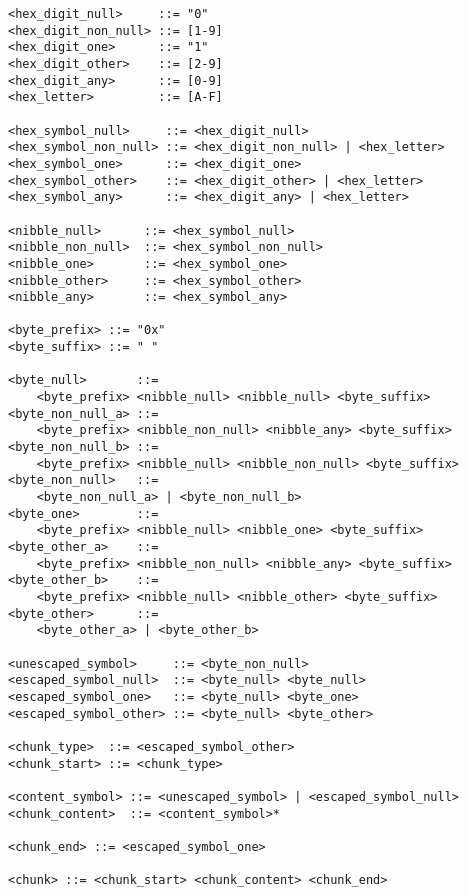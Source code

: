 \begin{lstlisting}
<hex_digit_null>     ::= "0"
<hex_digit_non_null> ::= [1-9]
<hex_digit_one>      ::= "1"
<hex_digit_other>    ::= [2-9]
<hex_digit_any>      ::= [0-9]
<hex_letter>         ::= [A-F]

<hex_symbol_null>     ::= <hex_digit_null>
<hex_symbol_non_null> ::= <hex_digit_non_null> | <hex_letter>
<hex_symbol_one>      ::= <hex_digit_one>
<hex_symbol_other>    ::= <hex_digit_other> | <hex_letter>
<hex_symbol_any>      ::= <hex_digit_any> | <hex_letter>

<nibble_null>      ::= <hex_symbol_null>
<nibble_non_null>  ::= <hex_symbol_non_null>
<nibble_one>       ::= <hex_symbol_one>
<nibble_other>     ::= <hex_symbol_other>
<nibble_any>       ::= <hex_symbol_any>

<byte_prefix> ::= "0x"
<byte_suffix> ::= " "

<byte_null>       ::= 
    <byte_prefix> <nibble_null> <nibble_null> <byte_suffix>
<byte_non_null_a> ::= 
    <byte_prefix> <nibble_non_null> <nibble_any> <byte_suffix>
<byte_non_null_b> ::= 
    <byte_prefix> <nibble_null> <nibble_non_null> <byte_suffix>
<byte_non_null>   ::= 
    <byte_non_null_a> | <byte_non_null_b>
<byte_one>        ::= 
    <byte_prefix> <nibble_null> <nibble_one> <byte_suffix>
<byte_other_a>    ::= 
    <byte_prefix> <nibble_non_null> <nibble_any> <byte_suffix>
<byte_other_b>    ::= 
    <byte_prefix> <nibble_null> <nibble_other> <byte_suffix>
<byte_other>      ::= 
    <byte_other_a> | <byte_other_b>

<unescaped_symbol>     ::= <byte_non_null>
<escaped_symbol_null>  ::= <byte_null> <byte_null>
<escaped_symbol_one>   ::= <byte_null> <byte_one>
<escaped_symbol_other> ::= <byte_null> <byte_other>

<chunk_type>  ::= <escaped_symbol_other>
<chunk_start> ::= <chunk_type>

<content_symbol> ::= <unescaped_symbol> | <escaped_symbol_null>
<chunk_content>  ::= <content_symbol>*

<chunk_end> ::= <escaped_symbol_one>

<chunk> ::= <chunk_start> <chunk_content> <chunk_end>
\end{lstlisting}
